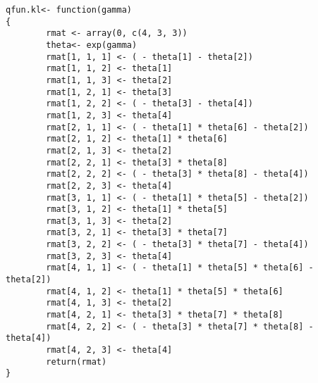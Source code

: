 \documentclass[12pt]{article}
\begin{document}
\begin{verbatim}
qfun.kl<- function(gamma)
{
        rmat <- array(0, c(4, 3, 3))
        theta<- exp(gamma)
        rmat[1, 1, 1] <- ( - theta[1] - theta[2])
        rmat[1, 1, 2] <- theta[1]
        rmat[1, 1, 3] <- theta[2]
        rmat[1, 2, 1] <- theta[3]
        rmat[1, 2, 2] <- ( - theta[3] - theta[4])
        rmat[1, 2, 3] <- theta[4]
        rmat[2, 1, 1] <- ( - theta[1] * theta[6] - theta[2])
        rmat[2, 1, 2] <- theta[1] * theta[6]
        rmat[2, 1, 3] <- theta[2]
        rmat[2, 2, 1] <- theta[3] * theta[8]
        rmat[2, 2, 2] <- ( - theta[3] * theta[8] - theta[4])
        rmat[2, 2, 3] <- theta[4]
        rmat[3, 1, 1] <- ( - theta[1] * theta[5] - theta[2])
        rmat[3, 1, 2] <- theta[1] * theta[5]
        rmat[3, 1, 3] <- theta[2]
        rmat[3, 2, 1] <- theta[3] * theta[7]
        rmat[3, 2, 2] <- ( - theta[3] * theta[7] - theta[4])
        rmat[3, 2, 3] <- theta[4]
        rmat[4, 1, 1] <- ( - theta[1] * theta[5] * theta[6] - theta[2])
        rmat[4, 1, 2] <- theta[1] * theta[5] * theta[6]
        rmat[4, 1, 3] <- theta[2]
        rmat[4, 2, 1] <- theta[3] * theta[7] * theta[8]
        rmat[4, 2, 2] <- ( - theta[3] * theta[7] * theta[8] - theta[4])
        rmat[4, 2, 3] <- theta[4]
        return(rmat)
}


\end{verbatim}
\end{document}
